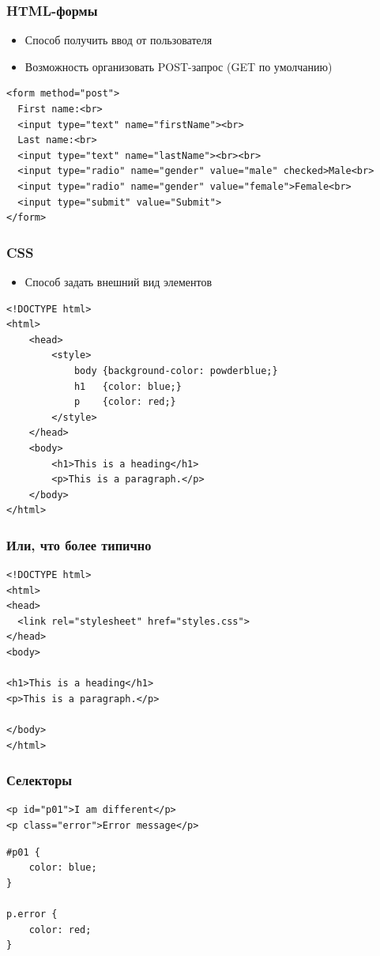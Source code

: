 \documentclass{../../slides-style}
\begin{document}
    \begin{frame}[fragile]
        \frametitle{HTML-формы}
        \begin{itemize}
            \item Способ получить ввод от пользователя
            \item Возможность организовать POST-запрос (GET по умолчанию)
        \end{itemize}
        \begin{verbatim}
<form method="post">
  First name:<br>
  <input type="text" name="firstName"><br>
  Last name:<br>
  <input type="text" name="lastName"><br><br>
  <input type="radio" name="gender" value="male" checked>Male<br>
  <input type="radio" name="gender" value="female">Female<br>
  <input type="submit" value="Submit">
</form>
        \end{verbatim}
    \end{frame}

    \begin{frame}[fragile]
        \frametitle{CSS}
        \begin{itemize}
            \item Способ задать внешний вид элементов
        \end{itemize}
        \begin{verbatim}
<!DOCTYPE html>
<html>
    <head>
        <style>
            body {background-color: powderblue;}
            h1   {color: blue;}
            p    {color: red;}
        </style>
    </head>
    <body>
        <h1>This is a heading</h1>
        <p>This is a paragraph.</p>
    </body>
</html>
        \end{verbatim}
    \end{frame}

    \begin{frame}[fragile]
        \frametitle{Или, что более типично}
        \begin{verbatim}
<!DOCTYPE html>
<html>
<head>
  <link rel="stylesheet" href="styles.css">
</head>
<body>

<h1>This is a heading</h1>
<p>This is a paragraph.</p>

</body>
</html>
        \end{verbatim}
    \end{frame}

    \begin{frame}[fragile]
        \frametitle{Селекторы}
        \begin{verbatim}
<p id="p01">I am different</p>
<p class="error">Error message</p>
        \end{verbatim}
        \vspace{5mm}
        \begin{verbatim}
#p01 {
    color: blue;
}

p.error {
    color: red;
}
        \end{verbatim}
    \end{frame}
\end{document}
